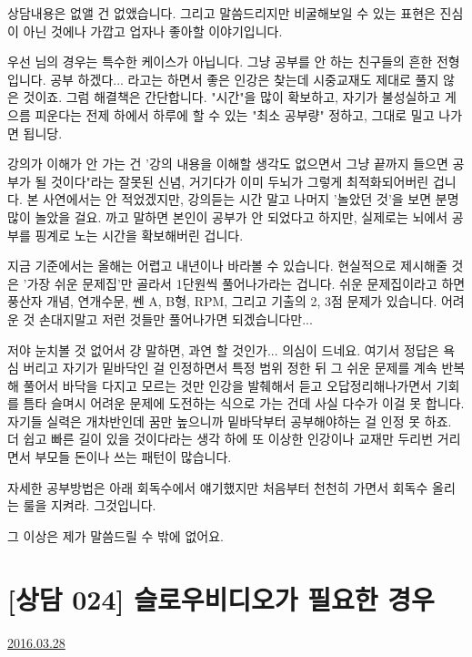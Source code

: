 상담내용은 없앨 건 없앴습니다. 그리고 말씀드리지만 비굴해보일 수 있는 표현은 진심이 아닌 것에나 가깝고
업자나 좋아할 이야기입니다.
\vspace{5mm}

우선 님의 경우는 특수한 케이스가 아닙니다. 그냥 공부를 안 하는 친구들의 흔한 전형입니다.
공부 하겠다... 라고는 하면서 좋은 인강은 찾는데 시중교재도 제대로 풀지 않은 것이죠.
그럼 해결책은 간단합니다.
"시간"을 많이 확보하고, 자기가 불성실하고 게으름 피운다는 전제 하에서 하루에 할 수 있는 "최소 공부량" 정하고,
그대로 밀고 나가면 됩니당.
\vspace{5mm}

강의가 이해가 안 가는 건 '강의 내용을 이해할 생각도 없으면서 그냥 끝까지 들으면 공부가 될 것이다"라는 잘못된 신념,
거기다가 이미 두뇌가 그렇게 최적화되어버린 겁니다.
본 사연에서는 안 적었겠지만, 강의듣는 시간 말고 나머지 '놀았던 것'을 보면 분명 많이 놀았을 걸요.
까고 말하면 본인이 공부가 안 되었다고 하지만, 실제로는 뇌에서 공부를 핑계로 노는 시간을 확보해버린 겁니다.
\vspace{5mm}

지금 기준에서는 올해는 어렵고 내년이나 바라볼 수 있습니다.
현실적으로 제시해줄 것은 '가장 쉬운 문제집'만 골라서 1단원씩 풀어나가라는 겁니다.
쉬운 문제집이라고 하면 풍산자 개념, 연개수문, 쎈 A, B형, RPM, 그리고 기출의 2, 3점 문제가 있습니다.
어려운 것 손대지말고 저런 것들만 풀어나가면 되겠습니다만...
\vspace{5mm}

저야 눈치볼 것 없어서 걍 말하면, 과연 할 것인가... 의심이 드네요.
여기서 정답은 욕심 버리고 자기가 밑바닥인 걸 인정하면서 특정 범위 정한 뒤 그 쉬운 문제를 계속 반복해 풀어서 바닥을 다지고
모르는 것만 인강을 발췌해서 듣고 오답정리해나가면서 기회를 틈타 슬며시 어려운 문제에 도전하는 식으로 가는 건데
사실 다수가 이걸 못 합니다. 자기들 실력은 개차반인데 꿈만 높으니까 밑바닥부터 공부해야하는 걸 인정 못 하죠.
더 쉽고 빠른 길이 있을 것이다라는 생각 하에 또 이상한 인강이나 교재만 두리번 거리면서 부모들 돈이나 쓰는 패턴이 많습니다.
\vspace{5mm}

자세한 공부방법은 아래 회독수에서 얘기했지만 처음부터 천천히 가면서 회독수 올리는 룰을 지켜라.
그것입니다.
\vspace{5mm}

그 이상은 제가 말씀드릴 수 밖에 없어요.
\vspace{5mm}






\section{[상담 024] 슬로우비디오가 필요한 경우}
\href{https://www.kockoc.com/Apoc/699646}{2016.03.28}

